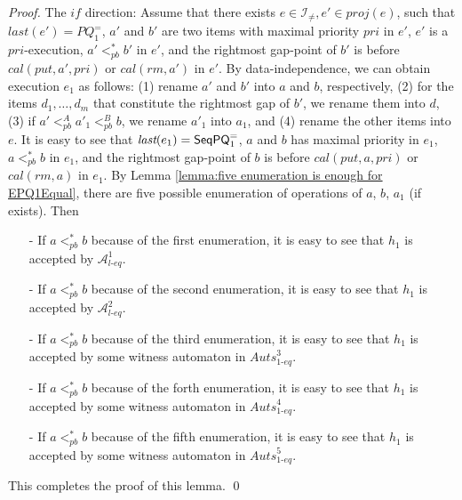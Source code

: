 \begin {proof}
\noindent The $\textit{if}$ direction: Assume that there exists $e \in \mathcal{I}_{\neq},e' \in \textit{proj}(e)$, such that $last(e')=\textit{PQ}_1^{=}$, $a'$ and $b'$ are two items with maximal priority $\textit{pri}$ in $e'$, $e'$ is a $\textit{pri}$-execution, $a' <_{\textit{pb}}^* b'$ in $e'$, and the rightmost gap-point of $b'$ is before $\textit{cal}(\textit{put},a',\textit{pri})$ or $\textit{cal}(\textit{rm},a')$ in $e'$. By data-independence, we can obtain execution $e_1$ as follows: (1) rename $a'$ and $b'$ into $a$ and $b$, respectively, (2) for the items $d_1,\ldots,d_m$ that constitute the rightmost gap of $b'$, we rename them into $d$, (3) if $a' <_{\textit{pb}}^A a'_1 <_{\textit{pb}}^B b$, we rename $a'_1$ into $a_1$, and (4) rename the other items into $e$. It is easy to see that $\textit{last}(e_1) = \mathsf{SeqPQ}_1^{=}$, $a$ and $b$ has maximal priority in $e_1$, $a <_{\textit{pb}}^* b$ in $e_1$, and the rightmost gap-point of $b$ is before $\textit{cal}(\textit{put},a,\textit{pri})$ or $\textit{cal}(\textit{rm},a)$ in $e_1$. By Lemma \ref{lemma:five enumeration is enough for EPQ1Equal}, there are five possible enumeration of operations of $a$, $b$, $a_1$ (if exists). Then


\begin{itemize}
\setlength{\itemsep}{0.5pt}
\item[-] If $a <_{\textit{pb}}^* b$ because of the first enumeration, it is easy to see that $h_1$ is accepted by $\mathcal{A}_{\textit{l-eq}}^1$.

\item[-] If $a <_{\textit{pb}}^* b$ because of the second enumeration, it is easy to see that $h_1$ is accepted by $\mathcal{A}_{\textit{l-eq}}^2$.

\item[-] If $a <_{\textit{pb}}^* b$ because of the third enumeration, it is easy to see that $h_1$ is accepted by some witness automaton in $\textit{Auts}_{\textit{1-eq}}^{3}$.

\item[-] If $a <_{\textit{pb}}^* b$ because of the forth enumeration, it is easy to see that $h_1$ is accepted by some witness automaton in $\textit{Auts}_{\textit{1-eq}}^{4}$.

\item[-] If $a <_{\textit{pb}}^* b$ because of the fifth enumeration, it is easy to see that $h_1$ is accepted by some witness automaton in $\textit{Auts}_{\textit{1-eq}}^{5}$.
\end{itemize}

This completes the proof of this lemma. \qed
\end {proof}





